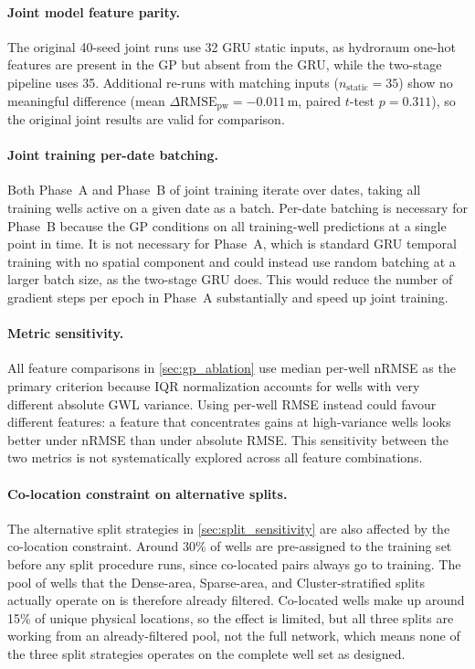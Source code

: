 \paragraph{Joint model feature parity.}
The original 40-seed joint runs use 32 GRU static inputs, as hydroraum one-hot features are present in the GP but absent from the GRU, while the two-stage pipeline uses 35. Additional re-runs with matching inputs ($n_\text{static} = 35$) show no meaningful difference (mean $\Delta\text{RMSE}_\text{pw} = -0.011\,\text{m}$, paired $t$-test $p = 0.311$), so the original joint results are valid for comparison.

\paragraph{Joint training per-date batching.}
Both Phase~A and Phase~B of joint training iterate over dates, taking all training wells active on a given date as a batch. Per-date batching is necessary for Phase~B because the GP conditions on all training-well predictions at a single point in time. It is not necessary for Phase~A, which is standard GRU temporal training with no spatial component and could instead use random batching at a larger batch size, as the two-stage GRU does. This would reduce the number of gradient steps per epoch in Phase~A substantially and speed up joint training.

\paragraph{Metric sensitivity.}
All feature comparisons in \cref{sec:gp_ablation} use median per-well nRMSE as the primary criterion because IQR normalization accounts for wells with very different absolute GWL variance. Using per-well RMSE instead could favour different features: a feature that concentrates gains at high-variance wells looks better under nRMSE than under absolute RMSE. This sensitivity between the two metrics is not systematically explored across all feature combinations.

\paragraph{Co-location constraint on alternative splits.}
The alternative split strategies in \cref{sec:split_sensitivity} are also affected by the co-location constraint. Around 30\% of wells are pre-assigned to the training set before any split procedure runs, since co-located pairs always go to training. The pool of wells that the Dense-area, Sparse-area, and Cluster-stratified splits actually operate on is therefore already filtered. Co-located wells make up around 15\% of unique physical locations, so the effect is limited, but all three splits are working from an already-filtered pool, not the full network, which means none of the three split strategies operates on the complete well set as designed.

